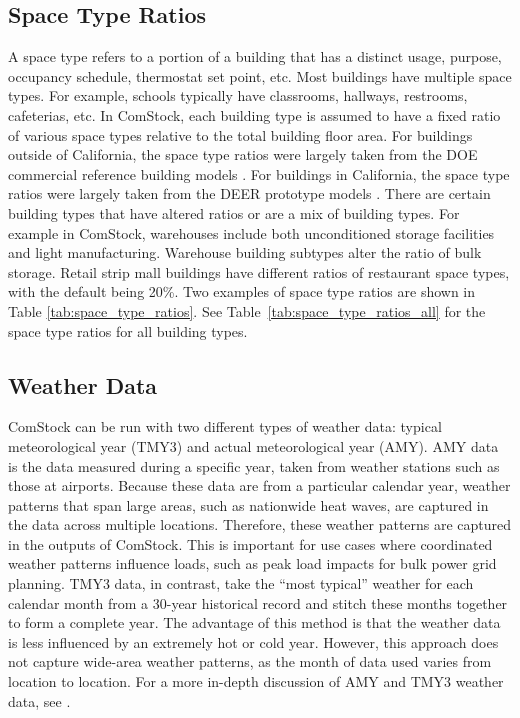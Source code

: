 




\subsection{Space Type Ratios}
\label{sec:space_type_ratios}
A space type refers to a portion of a building that has a distinct usage, purpose, occupancy schedule, thermostat set point, etc. Most buildings have multiple space types. For example, schools typically have classrooms, hallways, restrooms, cafeterias, etc. In ComStock, each building type is assumed to have a fixed ratio of various space types relative to the total building floor area. For buildings outside of California, the space type ratios were largely taken from the DOE commercial reference building models \citep{deru_2011}. For buildings in California, the space type ratios were largely taken from the DEER prototype models \citep{cpuc_deer}. There are certain building types that have altered ratios or are a mix of building types. For example in ComStock, warehouses include both unconditioned storage facilities and light manufacturing. Warehouse building subtypes alter the ratio of bulk storage. Retail strip mall buildings have different ratios of restaurant space types, with the default being 20\%. Two examples of space type ratios are shown in Table \ref{tab:space_type_ratios}. See Table~\ref{tab:space_type_ratios_all} for the space type ratios for all building types.



\subsection{Weather Data}
ComStock can be run with two different types of weather data: typical meteorological year (TMY3) and actual meteorological year (AMY). AMY data is the data measured during a specific year, taken from weather stations such as those at airports. Because these data are from a particular calendar year, weather patterns that span large areas, such as nationwide heat waves, are captured in the data across multiple locations. Therefore, these weather patterns are captured in the outputs of ComStock. This is important for use cases where coordinated weather patterns influence loads, such as peak load impacts for bulk power grid planning. TMY3 data, in contrast, take the ``most typical'' weather for each calendar month from a 30-year historical record and stitch these months together to form a complete year. The advantage of this method is that the weather data is less influenced by an extremely hot or cold year. However, this approach does not capture wide-area weather patterns, as the month of data used varies from location to location. For a more in-depth discussion of AMY and TMY3 weather data, see \cite{eulp_final_report}.

